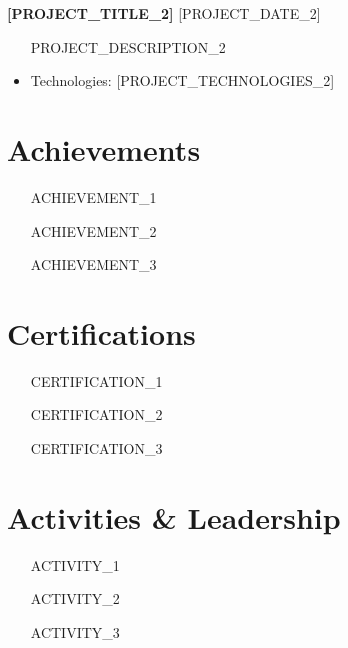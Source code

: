 \documentclass[11pt,a4paper]{article}
\newcommand{\resumesubentry}[2]{
    \textbf{#1} \hfill #2 \\
    \vspace{0.1cm}
}
\begin{document}
\resumesubentry{[PROJECT_TITLE_2]}{[PROJECT_DATE_2]}
\begin{itemize}[leftmargin=0.2in]
    \item [PROJECT_DESCRIPTION_2]
    \item Technologies: [PROJECT_TECHNOLOGIES_2]
\end{itemize}

\section{Achievements}
\begin{itemize}[leftmargin=0.2in]
    \item [ACHIEVEMENT_1]
    \item [ACHIEVEMENT_2]
    \item [ACHIEVEMENT_3]
\end{itemize}

\section{Certifications}
\begin{itemize}[leftmargin=0.2in]
    \item [CERTIFICATION_1]
    \item [CERTIFICATION_2]
    \item [CERTIFICATION_3]
\end{itemize}

\section{Activities \& Leadership}
\begin{itemize}[leftmargin=0.2in]
    \item [ACTIVITY_1]
    \item [ACTIVITY_2]
    \item [ACTIVITY_3]
\end{itemize}
\end{document}
